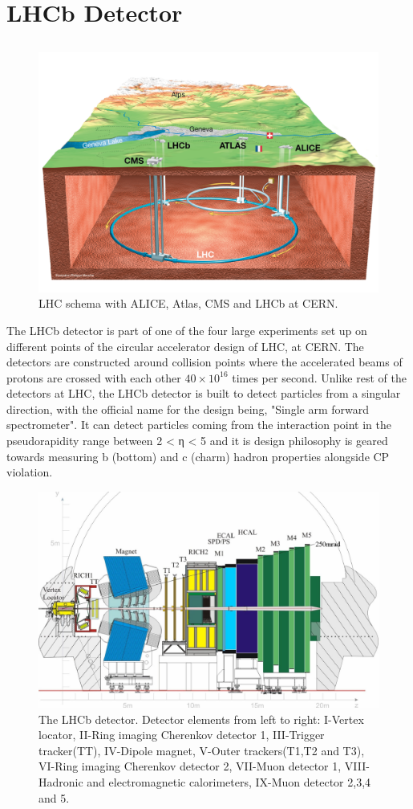 \chapter{LHCb Detector}\label{chap:02}

\section{}

\begin{figure}[H]
    \centering
    \includegraphics[width=0.7\linewidth]{images/LHC_scheme.png}
    \caption{LHC schema with ALICE, Atlas, CMS and LHCb at CERN.}
    \label{LHC}
\end{figure}

The LHCb detector is part of one of the four large experiments set up on different points of the circular accelerator design of LHC, at CERN. The detectors are constructed around collision points where the accelerated beams of protons are crossed with each other \( 40 \times 10^{16} \) times per second. Unlike rest of the detectors at LHC, the LHCb detector is built to detect particles from a singular direction, with the official name for the design being, "Single arm forward spectrometer". It can detect particles coming from the interaction point in the pseudorapidity range between 2 < η < 5 and it is design philosophy is geared towards measuring b (bottom) and c (charm) hadron properties alongside CP violation. \cite{LHCb_detector}


\begin{figure}[H]
    \centering
    \includegraphics[width=0.7\linewidth]{images/LHCb_diagram.png}
    \caption{The LHCb detector. Detector elements from left to right:  I-Vertex locator, II-Ring imaging Cherenkov detector 1, III-Trigger tracker(TT), IV-Dipole magnet, V-Outer trackers(T1,T2 and T3), VI-Ring imaging Cherenkov detector 2, VII-Muon detector 1, VIII-Hadronic and electromagnetic calorimeters, IX-Muon detector 2,3,4 and 5.}
    \label{LHCb}
\end{figure}

